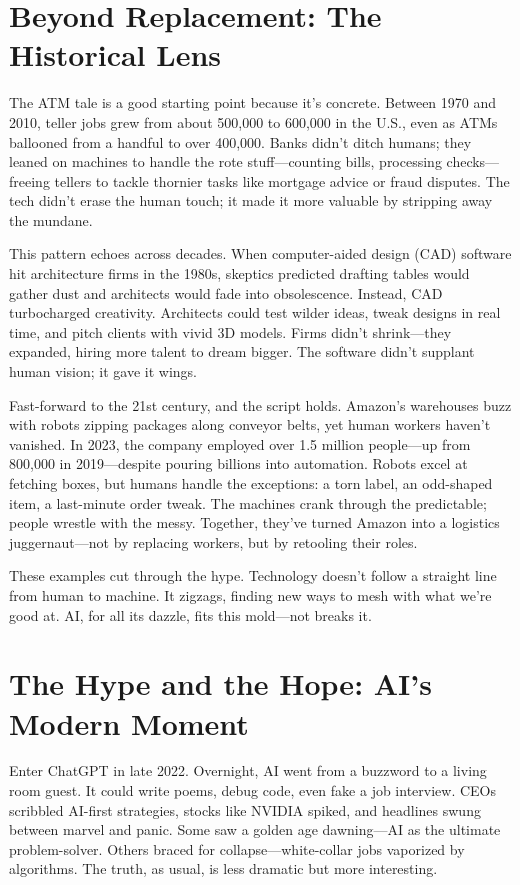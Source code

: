 \documentclass[
  Letterpaper,
]{scrbook}
\begin{document}
\section{Beyond Replacement: The Historical
Lens}\label{beyond-replacement-the-historical-lens}

The ATM tale is a good starting point because it's concrete. Between
1970 and 2010, teller jobs grew from about 500,000 to 600,000 in the
U.S., even as ATMs ballooned from a handful to over 400,000. Banks
didn't ditch humans; they leaned on machines to handle the rote
stuff---counting bills, processing checks---freeing tellers to tackle
thornier tasks like mortgage advice or fraud disputes. The tech didn't
erase the human touch; it made it more valuable by stripping away the
mundane.

This pattern echoes across decades. When computer-aided design (CAD)
software hit architecture firms in the 1980s, skeptics predicted
drafting tables would gather dust and architects would fade into
obsolescence. Instead, CAD turbocharged creativity. Architects could
test wilder ideas, tweak designs in real time, and pitch clients with
vivid 3D models. Firms didn't shrink---they expanded, hiring more talent
to dream bigger. The software didn't supplant human vision; it gave it
wings.

Fast-forward to the 21st century, and the script holds. Amazon's
warehouses buzz with robots zipping packages along conveyor belts, yet
human workers haven't vanished. In 2023, the company employed over 1.5
million people---up from 800,000 in 2019---despite pouring billions into
automation. Robots excel at fetching boxes, but humans handle the
exceptions: a torn label, an odd-shaped item, a last-minute order tweak.
The machines crank through the predictable; people wrestle with the
messy. Together, they've turned Amazon into a logistics juggernaut---not
by replacing workers, but by retooling their roles.

These examples cut through the hype. Technology doesn't follow a
straight line from human to machine. It zigzags, finding new ways to
mesh with what we're good at. AI, for all its dazzle, fits this
mold---not breaks it.

\section{The Hype and the Hope: AI's Modern
Moment}\label{the-hype-and-the-hope-ais-modern-moment}

Enter ChatGPT in late 2022. Overnight, AI went from a buzzword to a
living room guest. It could write poems, debug code, even fake a job
interview. CEOs scribbled AI-first strategies, stocks like NVIDIA
spiked, and headlines swung between marvel and panic. Some saw a golden
age dawning---AI as the ultimate problem-solver. Others braced for
collapse---white-collar jobs vaporized by algorithms. The truth, as
usual, is less dramatic but more interesting.
\end{document}
